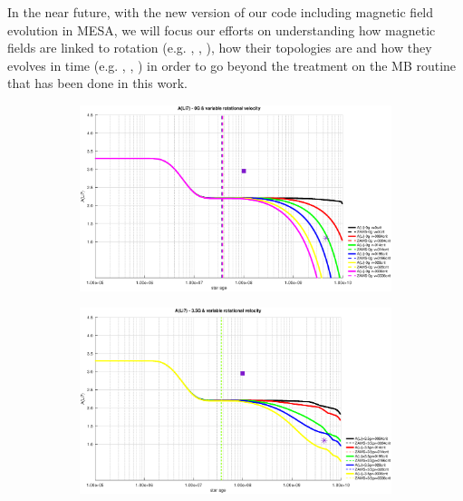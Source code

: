 \documentclass[fleqn,usenatbib]{mnras}
\begin{document}
In the near future, with the new version of our code including magnetic field evolution in MESA, we will focus our efforts on understanding how magnetic fields are linked to rotation (e.g. \citep{Maeder2005}, \citep{Morin2012}, \citep{Gondoin2018}), how their topologies are and how they evolves in time (e.g. \citep{Keppens1995}, \citep{Maeder2003a}, \citep{Vidotto2014}) in order to go beyond the treatment on the MB routine that has been done in this work.\par




\begin{figure}
    \centering
    \begin{subfigure}[h]{0.47\textwidth}
    \includegraphics[width=\textwidth]{figures/li_var_vel_0_0g.eps}
    \label{fig:subim1}
    \end{subfigure}
    \begin{subfigure}[h]{0.47\textwidth}
    \includegraphics[width=\textwidth]{figures/li_var_vel_3_5g.eps}
    \label{fig:subim2}
    \end{subfigure}
    

\end{figure}
\end{document}
